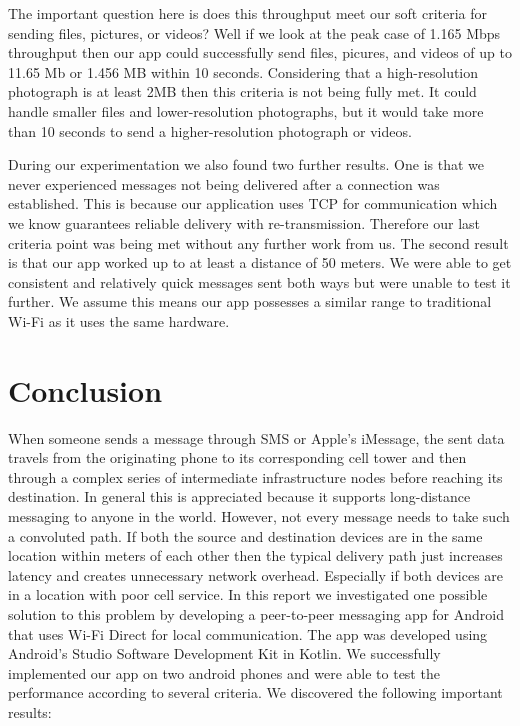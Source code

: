 \documentclass[10pt]{article}
\begin{document}
The important question here is does this throughput meet our soft criteria for sending files, pictures, or videos? Well if we look at the peak case of 1.165 Mbps throughput then our app could successfully send files, picures, and videos of up to 11.65 Mb or 1.456 MB within 10 seconds. Considering that a high-resolution photograph is at least 2MB then this criteria is not being fully met. It could handle smaller files and lower-resolution photographs, but it would take more than 10 seconds to send a higher-resolution photograph or videos.

During our experimentation we also found two further results. One is that we never experienced messages not being delivered after a connection was established. This is because our application uses TCP for communication which we know guarantees reliable delivery with re-transmission. Therefore our last criteria point was being met without any further work from us. The second result is that our app worked up to at least a distance of 50 meters. We were able to get consistent and relatively quick messages sent both ways but were unable to test it further. We assume this means our app possesses a similar range to traditional Wi-Fi as it uses the same hardware.

\section{Conclusion}


When someone sends a message through SMS or Apple's iMessage, the sent data travels from the originating phone to its corresponding cell tower and then through a complex series of intermediate infrastructure nodes before reaching its destination. In general this is appreciated because it supports long-distance messaging to anyone in the world. However, not every message needs to take such a convoluted path. If both the source and destination devices are in the same location within meters of each other then the typical delivery path just increases latency and creates unnecessary network overhead. Especially if both devices are in a location with poor cell service. In this report we investigated one possible solution to this problem by developing a peer-to-peer messaging app for Android that uses Wi-Fi Direct for local communication. The app was developed using Android’s Studio Software Development Kit in Kotlin. We successfully implemented our app on two android phones and were able to test the performance according to several criteria. We discovered the following important results:
\end{document}
